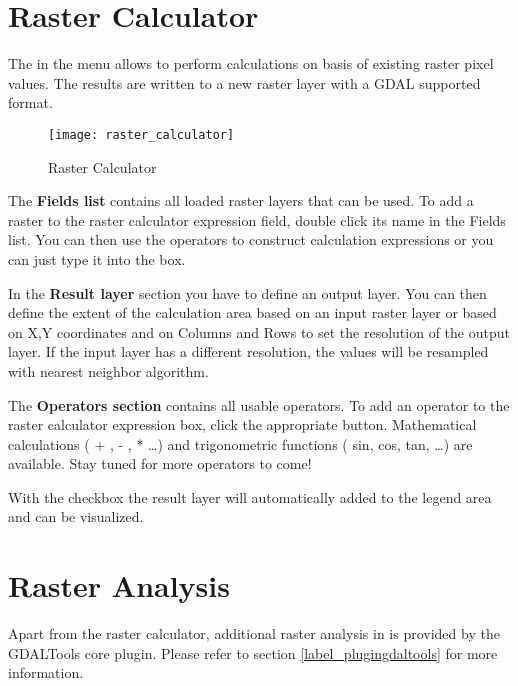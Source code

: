 \section{Raster Calculator}\label{sec:raster_calc}

The  in the  menu allows to 
perform calculations on basis of existing raster pixel values. The results 
are written to a new raster layer with a GDAL supported format. 

\begin{figure}[ht]
  \centering
    \texttt{[image: raster\_calculator]}
    \caption{Raster Calculator \nixcaption}\label{fig:raster_calculator}
\end{figure}

The \textbf{Fields list} contains all loaded raster layers that can be used. 
To add a raster to the raster calculator expression field, double
click its name in the Fields list. You can then use the operators to construct 
calculation expressions or you can just type it into the box.

In the \textbf{Result layer} section you have to define an output layer. You can 
then define the extent of the calculation area based on an input raster layer or 
based on X,Y coordinates and on Columns and Rows to set the resolution of the 
output layer. If the input layer has a different resolution, the values will be 
resampled with nearest neighbor algorithm.  

The \textbf{Operators section} contains all usable operators. To add an operator
to the raster calculator expression box, click the appropriate button. Mathematical
calculations ( + , - , * \dots) and trigonometric functions ( sin, cos, tan, \dots) 
are available. Stay tuned for more operators to come!

With the  checkbox the result layer will automatically 
added to the legend area and can be visualized. 

\section{Raster Analysis}\label{sec:raster_analysis}

Apart from the raster calculator, additional raster analysis in  is provided by the GDALTools core plugin. Please refer to section \ref{label_plugingdaltools} for more information.

\FloatBarrier
